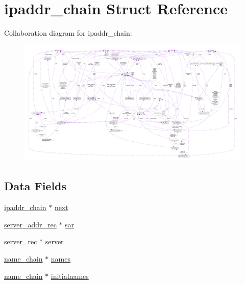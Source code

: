 \hypertarget{structipaddr__chain}{}\section{ipaddr\+\_\+chain Struct Reference}
\label{structipaddr__chain}


Collaboration diagram for ipaddr\+\_\+chain\+:
\nopagebreak
\begin{figure}[H]
\begin{center}
\leavevmode
\includegraphics[width=350pt]{structipaddr__chain__coll__graph}
\end{center}
\end{figure}
\subsection*{Data Fields}
\begin{DoxyCompactItemize}
\item 
\hyperlink{structipaddr__chain}{ipaddr\+\_\+chain} $\ast$ \hyperlink{structipaddr__chain_ab97edaa652fcb5e0e3bfa448e1999638}{next}
\item 
\hyperlink{structserver__addr__rec}{server\+\_\+addr\+\_\+rec} $\ast$ \hyperlink{structipaddr__chain_a6ac2cc1263061eececba28f436dd2bd6}{sar}
\item 
\hyperlink{structserver__rec}{server\+\_\+rec} $\ast$ \hyperlink{structipaddr__chain_a67120925940112a50cd3c5d3d558357f}{server}
\item 
\hyperlink{structname__chain}{name\+\_\+chain} $\ast$ \hyperlink{structipaddr__chain_ad9390274138baf9a904e07690b8370a2}{names}
\item 
\hyperlink{structname__chain}{name\+\_\+chain} $\ast$ \hyperlink{structipaddr__chain_a9d8fbaa4ecaa13cbf53d5d03f01e19b4}{initialnames}
\end{DoxyCompactItemize}


